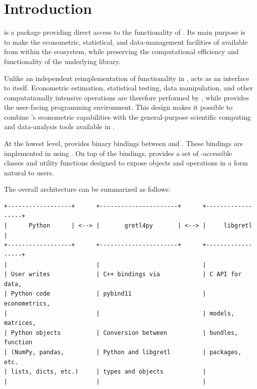 \chapter*{Introduction}
\label{sec:introduction}

\gretlpy is a \python package providing direct access to the
functionality of \lgretl \citep{gretl_manual}. Its main purpose is to
make the econometric, statistical, and data-management facilities of
\gretl available from within the \python ecosystem, while preserving
the computational efficiency and functionality of the underlying
\lgretl library.

Unlike an independent reimplementation of \gretl functionality in
\python, \gretlpy acts as an interface to \lgretl itself. Econometric
estimation, statistical testing, data manipulation, and other
computationally intensive operations are therefore performed by
\lgretl, while \python provides the user-facing programming
environment. This design makes it possible to combine \gretl's
econometric capabilities with the general-purpose scientific computing
and data-analysis tools available in \python.

At the lowest level, \gretlpy provides binary bindings between
\python and \lgretl. These bindings are implemented in \cpp using
 \citep[see][for details]{pybind11}. On top of the
bindings, \gretlpy provides a set of \python-accessible classes and
utility functions designed to expose \lgretl objects and operations in
a form natural to \python users.

The overall architecture can be summarized as follows:

\begin{center}\small
\begin{BVerbatim}
+------------------+      +----------------------+      +------------------+
|      Python      | <--> |       gretl4py       | <--> |     libgretl     |
+------------------+      +----------------------+      +------------------+
|                         |                             |
| User writes             | C++ bindings via            | C API for data,
| Python code             | pybind11                    | econometrics,
|                         |                             | models, matrices,
| Python objects          | Conversion between          | bundles, function
| (NumPy, pandas,         | Python and libgretl         | packages, etc.
| lists, dicts, etc.)     | types and objects           |
|                         |                             |
\end{BVerbatim}
\end{center}

